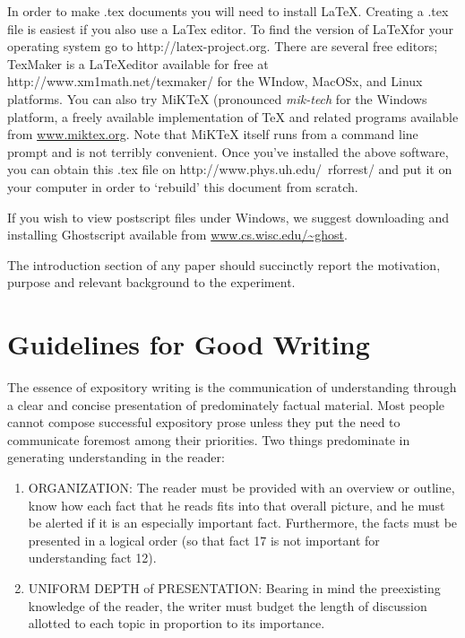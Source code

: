 \documentclass[aps,twocolumn,secnumarabic,nobalancelastpage,amsmath,amssymb,nofootinbib]{revtex4}
\begin{document}
In order to make .tex documents you will need to install \LaTeX.
Creating a .tex file is easiest if you also use a LaTex editor. To find 
the version of \LaTeX for your operating system go to http://latex-project.org.
There are several free editors; TexMaker is a \LaTeX editor 
available for free at http://www.xm1math.net/texmaker/ for the WIndow,
MacOSx, and Linux platforms. You 
can also try MiKTeX (pronounced \emph{mik-tech} for the Windows platform,
a freely available implementation of TeX and related programs
available from \url{www.miktex.org}. Note that MiKTeX itself runs
from a command line prompt and is not terribly convenient. Once you've installed 
the above software, you can obtain
this .tex file on http://www.phys.uh.edu/~rforrest/ and put it on your
computer in order to `rebuild' this document from scratch.  

If you wish to view postscript files under Windows, we
suggest downloading and installing Ghostscript available from
\url{www.cs.wisc.edu/~ghost}.

The introduction section of any paper should succinctly report 
the motivation, purpose and relevant background to the experiment.
\section{Guidelines for Good Writing \cite{pritchard1990}}

The essence of expository writing is the communication of
understanding through a clear and concise presentation of
predominately factual material. Most people cannot compose
successful expository prose unless they put the need to communicate
foremost among their priorities. Two things predominate in
generating understanding in the reader:
\begin{enumerate}
\item ORGANIZATION: The reader must be provided with an overview or
outline, know how each fact that he reads fits into that overall
picture, and he must be alerted if it is an especially important
fact. Furthermore, the facts must be presented in a logical order
(so that fact 17 is not important for understanding fact 12).

\item UNIFORM DEPTH of PRESENTATION: Bearing in mind the preexisting
knowledge of the reader, the writer must budget the length of
discussion allotted to each topic in proportion to its importance.

\end{enumerate}
\end{document}
